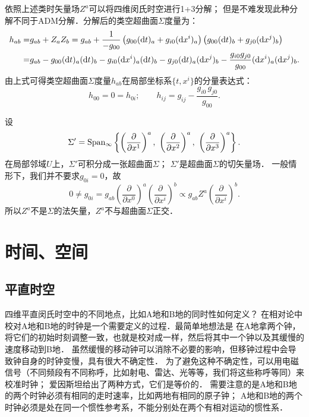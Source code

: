 依照上述类时矢量场$Z^a$可以将四维闵氏时空进行1+3分解；
但是不难发现此种分解不同于ADM分解．分解后的类空超曲面$\Sigma$度量为：
\begin{align*}
	h_{ab}=& g_{ab} + Z_a Z_b
	= g_{ab} + \frac{1}{-g_{00}}
	\left(g_{00}({\rm d}t)_a + g_{i0} ({\rm d}x^i)_a\right)
	\left(g_{00}({\rm d}t)_b + g_{j0} ({\rm d}x^j)_b\right) \\
	=& g_{ab} - 
	g_{00}({\rm d}t)_a ({\rm d}t)_b - g_{i0} ({\rm d}x^i)_a ({\rm d}t)_b
	- g_{j0} ({\rm d}t)_a  ({\rm d}x^j)_b 
	-\frac{ g_{i0} g_{j0} }{g_{00}} ({\rm d}x^i)_a  ({\rm d}x^j)_b .
\end{align*}
由上式可得类空超曲面$\Sigma$度量$h_{ab}$在局部坐标系$\{t,x^i\}$的分量表达式：
\begin{equation}\label{chfd:eqn_CM-hij}
	h_{00} = 0 = h_{0i} ; \qquad
	h_{ij} = g_{ij} -\frac{ g_{i0}\, g_{j0} }{g_{00}}.
\end{equation}

设
\begin{equation}
	\Sigma'={\rm Span_{\infty}} \left\{ 
	\left(\frac{\partial}{\partial x^1}\right)^a,\
	\left(\frac{\partial}{\partial x^2}\right)^a,\
	\left(\frac{\partial}{\partial x^3}\right)^a \right\}  .
\end{equation}
在局部邻域$U$上，$\Sigma'$可积分成一张超曲面$\Sigma$；
$\Sigma'$是超曲面$\Sigma$的切矢量场．
一般情形下，我们并不要求$g_{0i}=0$，故
\begin{equation}
	0 \neq g_{0i} =g_{ab} \left(\frac{\partial}{\partial x^0}\right)^a
	\left(\frac{\partial}{\partial x^i}\right)^b
	\propto g_{ab} Z^a \left(\frac{\partial}{\partial x^i}\right)^b .
\end{equation}
所以$Z^a$不是$\Sigma$的法矢量，$Z^a$不与超曲面$\Sigma$正交．






\section{时间、空间}

\subsection{平直时空}
四维平直闵氏时空中的不同地点，比如A地和B地的同时性如何定义？
在相对论中校对A地和B地的时钟是一个需要定义的过程．最简单地想法是
在A地拿两个钟，将它们的初始时刻调整一致，也就是校对成一样，然后将其中一个钟以及其缓慢的速度移动到B地．
虽然缓慢的移动钟可以消除不必要的影响，但移钟过程中会导致钟自身的时钟变慢，具有很大不确定性．
为了避免这种不确定性，可以用电磁信号（不同频段有不同称呼，比如射电、雷达、光等等，我们将这些称呼等同）来校准时钟；
爱因斯坦给出了两种方式，它们是等价的．
需要注意的是A地和B地的两个时钟必须有相同的走时速率，比如两地有相同的{\kaishu 原子钟}；
A地和B地的两个时钟必须是处在同一个惯性参考系，不能分别处在两个有相对运动的惯性系．

